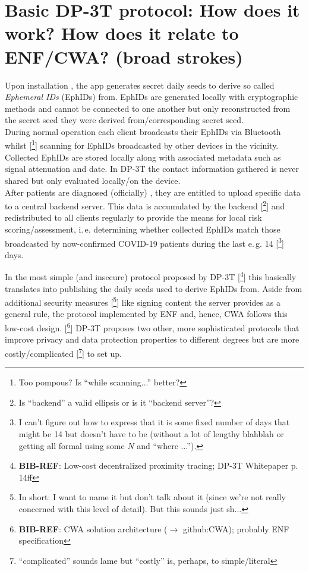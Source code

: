 \documentclass{article}
\newcommand*{\TODO}[2][todoC]{{\color{#1} #2}}
\newcommand*{\TODOsty}[2][styC]{\TODO[#1]{#2}}
\newcommand*{\TODOnsr}[2][nsrC]{\TODO[#1]{#2}}
\newcommand*{\TODOfn}[2][noteC]{\TODO[#1]{[\footnote{\TODO[#1]{#2}}]}}
\newcommand*{\TODOref}[2][todoC]{\TODOfn[#1]{\textbf{BIB-REF}: #2}}
\begin{document}
\section{Basic DP-3T protocol: How does it work? How does it relate to ENF/CWA? (broad strokes)}
%
Upon installation\TODOnsr{,} the app generates secret daily seeds to derive so called \textit{Ephemeral IDs} (EphIDs) \TODOnsr{from}. EphIDs are generated locally with cryptographic methods and cannot be connected to one another but only reconstructed \TODOnsr{from} the \TODOsty{secret seed they were derived from/corresponding secret seed}.\\
During normal operation each client broadcasts \TODOnsr{their} EphIDs via Bluetooth \TODOsty{whilst}\TODOfn[styC]{Too pompous? Is ``while scanning...'' better?} scanning \TODOnsr{for} EphIDs broadcasted by other devices in the vicinity. Collected EphIDs are stored locally along with associated metadata such as signal attenuation and date. In DP-3T the contact information gathered is never shared but only evaluated \TODOsty{locally/on the device}.\\
After patients are diagnosed \TODOnsr{(officially)}\TODOnsr{,} they are entitled to upload specific data to a central backend server. This data is accumulated by the \TODOnsr{backend}\TODOfn[nsrC]{Is ``backend'' a valid ellipsis or is it ``backend server''?} and redistributed to all clients regularly to \TODOnsr{provide the means for} local risk \TODOsty{scoring/assessment}, i.\,e. determining whether collected EphIDs match \TODOnsr{those} broadcasted by \TODOnsr{now-confirmed} COVID-19 patients during the last \TODOsty{e.\,g. 14}\TODOfn[styC]{%
      I can't figure out how to express that it is some fixed number of days that might be 14 but doesn't have to be (without a lot of lengthy blahblah or getting all formal using some $N$ and ``where ...'').} %
days.

In the most simple (and insecure) protocol proposed by DP-3T \TODOref{Low-cost decentralized proximity tracing; DP-3T Whitepaper p. 14ff} this \TODOsty{basically} translates into publishing the daily seeds used to derive EphIDs \TODOnsr{from}.
\TODOsty{Aside from additional security measures}\TODOfn[styC]{In short: I want to name it but don't talk about it (since we're not really concerned with this level of detail). But this sounds just sh...} like signing content the server provides \TODOnsr{as a general rule}, the protocol implemented by ENF and, hence, CWA follows this low-cost design.\TODOref{CWA solution architecture ($\rightarrow$ github:CWA); probably ENF specification} DP-3T proposes two other, more sophisticated protocols that improve \TODOsty{privacy and data protection properties} to different degrees but are more \TODOsty{costly/complicated}\TODOfn[styC]{``complicated'' sounds lame but ``costly'' is, perhaps, to simple/literal} to set up.
\end{document}

